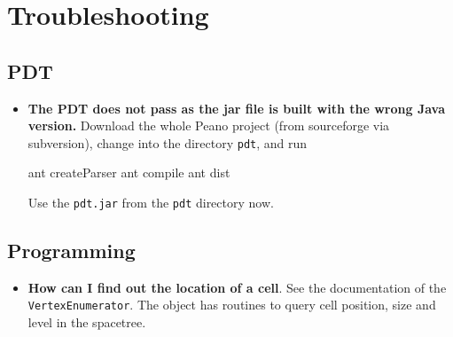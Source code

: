 \chapter{Troubleshooting}

\section{PDT}

\begin{itemize}
  \item {\bf The PDT does not pass as the jar file is built with the wrong Java
  version.} Download the whole Peano project (from sourceforge via subversion),
  change into the directory \texttt{pdt}, and run
  \begin{code}
  ant createParser
  ant compile
  ant dist
  \end{code}
  Use the \texttt{pdt.jar} from the \texttt{pdt} directory now. 
\end{itemize}



\section{Programming}

\begin{itemize}
  \item {\bf How can I find out the location of a cell}. See the documentation
  of the \texttt{VertexEnumerator}. The object has routines to query cell
  position, size and level in the spacetree.
\end{itemize}
